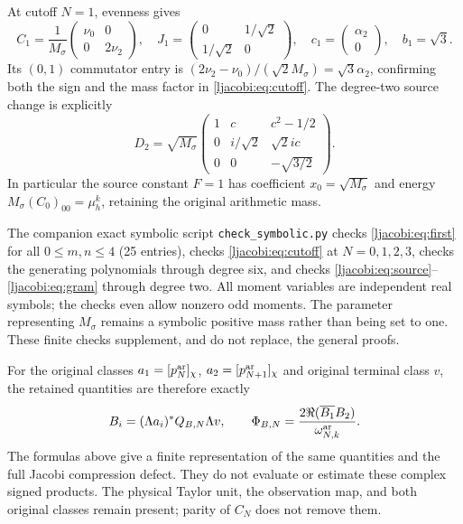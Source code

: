 \documentclass[11pt]{article}
\begin{document}
At cutoff $N=1$, evenness gives
\[
 C_1=\frac1{M_\sigma}\begin{pmatrix}\nu_0&0\\0&2\nu_2\end{pmatrix},
 \quad J_1=\begin{pmatrix}0&1/\sqrt2\\1/\sqrt2&0\end{pmatrix},
 \quad c_1=\begin{pmatrix}\alpha_2\\0\end{pmatrix},\quad b_1=\sqrt3.
\]
Its $(0,1)$ commutator entry is
$(2\nu_2-\nu_0)/(\sqrt2M_\sigma)=\sqrt3\alpha_2$,
confirming both the sign and the mass factor in \eqref{ljacobi:eq:cutoff}.
The degree-two source change is explicitly
\[
 D_2=\sqrt{M_\sigma}
 \begin{pmatrix}
 1&c&c^2-1/2\\
 0&i/\sqrt2&\sqrt2ic\\
 0&0&-\sqrt{3/2}
 \end{pmatrix}.
\]
In particular the source constant $F=1$ has coefficient
$x_0=\sqrt{M_\sigma}$ and energy
$M_\sigma(C_0)_{00}=\mu_h^k$, retaining the original arithmetic mass.

The companion exact symbolic script \texttt{check\_symbolic.py}
checks \eqref{ljacobi:eq:first} for all $0\leq m,n\leq4$ (25 entries),
checks \eqref{ljacobi:eq:cutoff} at $N=0,1,2,3$, checks the generating
polynomials through degree six, and checks
\eqref{ljacobi:eq:source}--\eqref{ljacobi:eq:gram} through degree two. All moment
variables are independent real symbols; the checks even allow
nonzero odd moments. The parameter representing $M_\sigma$ remains
a symbolic positive mass rather than being set to one. These
finite checks supplement, and do not replace, the general proofs.

For the original classes $a_1=[p_N^{\rm ar}]_\chi$,
$a_2=[p_{N+1}^{\rm ar}]_\chi$ and original terminal class $v$, the
retained quantities are therefore exactly
\[
 B_i=(\Lambda a_i)^*Q_{B,N}\Lambda v,\qquad
 \Phi_{B,N}=\frac{2\Re(\overline{B_1}B_2)}{\omega_{N,k}^{\rm ar}}.
\]
The formulas above give a finite representation of the same
quantities and the full Jacobi compression defect. They do not
evaluate or estimate these complex signed products. The physical
Taylor unit, the observation map, and both original classes remain
present; parity of $C_N$ does not remove them.


\endgroup

\end{document}
